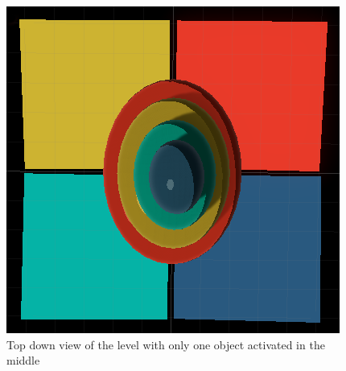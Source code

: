 \begin{figure}[p]
  \centering
  \includegraphics[width=\imgWidth]{images/workflow/object_morphing/TopDown.png}
  \caption{Top down view of the level with only one object activated in the middle}
  \label{MorphingLevel}
\end{figure}

